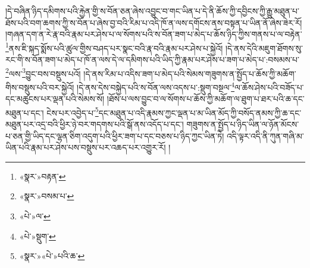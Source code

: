 །དེ་བཞིན་ཉིད་དམིགས་པའི་རྐྱེན་གྱི་ས་བོན་ཅན་ཞེས་འབྱུང་བ་གང་ཡིན་པ་དེ་ནི་ཆོས་ཀྱི་དབྱིངས་ཀྱི་རྒྱུ་མཐུན་པ་ཐོས་པའི་བག་ཆགས་ཀྱི་ས་བོན་པ་ཞེས་བྱ་བའི་རིམ་པ་འདི་ཁོ་ན་ལས་དགོངས་ནས་བསྟན་པ་ཡིན་ནོ་ཞེས་ཟེར་རོ། །གཞན་དག་ན་རེ་རྣ་བའི་རྣམ་པར་ཤེས་པ་ལ་སོགས་པའི་ས་བོན་ཟག་པ་མེད་པ་ཆོས་ཉིད་ཀྱིས་གནས་པ་ལ་བརྟེན་\footnote{«སྣར་»བརྟན་}ནས་ཇི་སྐད་སྨོས་པའི་ཚུལ་གྱིས་བཤད་པར་སྣང་བའི་རྣ་བའི་རྣམ་པར་ཤེས་པ་སྐྱེའོ། །དེ་ནས་དེའི་མཇུག་ཐོགས་སུ་རང་གི་ས་བོན་ཟག་པ་མེད་པ་ཁོ་ན་ལས་དེ་ལ་དམིགས་པའི་ཡིད་ཀྱི་རྣམ་པར་ཤེས་པ་ཟག་པ་མེད་པ་:བསམས་པ་\footnote{«སྣར་»བསམ་པ་}ལས་\footnote{«པེ་»ལ་}བྱུང་བས་བསྡུས་པའོ། །དེ་ནས་རིམ་པ་འདིས་ཟག་པ་མེད་པའི་སེམས་གཟུགས་ན་སྤྱོད་པ་ཆོས་ཀྱི་མཆོག་གིས་བསྡུས་པའི་བར་སྐྱེའོ། །དེ་ནས་དེས་བསྐྱེད་པའི་ས་བོན་ལས་འདས་པ་:སྡུག་བསྔལ་\footnote{«པེ་»སྡུག་}ལ་ཆོས་ཤེས་པའི་བཟོད་པ་དང་མཚུངས་པར་ལྡན་པའི་སེམས་སོ། །ཐོས་པ་ལས་བྱུང་བ་ལ་སོགས་པ་ཆོས་ཀྱི་མཆོག་ལ་ཐུག་པ་ཐར་པའི་ཆ་དང་མཐུན་པ་དང་། ངེས་པར་འབྱེད་པ་\footnote{«སྣར་»«པེ་»པའི་ཆ་}དང་མཐུན་པ་འདི་རྣམས་ཀྱང་ལྡན་པ་མ་ཡིན་མོད་ཀྱི་བསོད་ནམས་ཀྱི་ཆ་དང་མཐུན་པར་འདྲ་བའི་ཕྱིར་ཉེ་བར་གདགས་པའི་སྒོ་ནས་འདོད་པ་དང་། གཟུགས་ན་སྤྱོད་པ་ཉིད་ཡིན་ལ་ཉོན་མོངས་པ་ཅན་གྱི་ཡིད་དང་ལྷན་ཅིག་འདུག་པའི་ཕྱིར་ཟག་པ་དང་བཅས་པ་ཉིད་ཀྱང་ཡིན་ཏེ། འདི་ལྟར་འདི་ནི་ཀུན་གཞི་མ་ཡིན་པའི་རྣམ་པར་ཤེས་པས་བསྡུས་པར་འཆད་པར་འགྱུར་རོ། །
